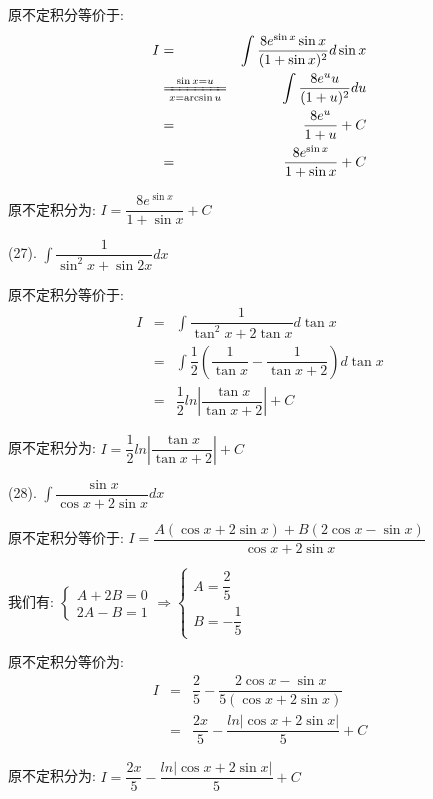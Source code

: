 \begin{anymark}[积分训练]
\begin{solution}
		原不定积分等价于:  
		\begin{eqnarray*}
			I&=&\int \dfrac{8e^{\sin x}\sin x}{(1+\sin x)^2}d\sin x\\
			&\xlongequal[x=\arcsin u]{\sin x=u}&\int\dfrac{8e^{u}u}{(1+u)^2}du\\
			&=&\dfrac{8e^u}{1+u}+C \\
			&=&\dfrac{8e^{\sin x}}{1+\sin x}+C
		\end{eqnarray*}
		
		原不定积分为:  $I=\dfrac{8e^{\sin x}}{1+\sin x}+C$
	\end{solution}
	(27). $\int \dfrac{1}{\sin^2x+\sin 2x}dx$
	\begin{solution}
		
		原不定积分等价于:  
		\begin{eqnarray*}
			I&=&\int \dfrac{1}{\tan^2 x+2\tan x}d\tan x\\
			&=&\int\dfrac{1}{2}\left(\dfrac{1}{\tan x}-\dfrac{1}{\tan x+2}\right)d\tan x\\
			&=&\dfrac{1}{2}ln|\dfrac{\tan x}{\tan x+2}|+C 
		\end{eqnarray*}
	
	原不定积分为:  $I=\dfrac{1}{2}ln|\dfrac{\tan x}{\tan x+2}|+C $
	\end{solution}
	(28). $\int \dfrac{\sin x}{\cos x+2\sin x}dx$
	\begin{solution}
		
		原不定积分等价于:  $I=\dfrac{A(\cos x+2\sin x)+B(2\cos x-\sin x)}{\cos x+2\sin x}$
		
		我们有:  $\left\lbrace
		\begin{array}{l}
			A+2B=0\\
			2A-B=1
		\end{array}
		\right. \Rightarrow \left\lbrace
		\begin{array}{l}
			A=\dfrac{2}{5}\\
			B=-\dfrac{1}{5}
		\end{array}
		\right. $
		
		原不定积分等价为:  
		\begin{eqnarray*}
			I&=&\dfrac{2}{5}-\dfrac{2\cos x-\sin x}{5(\cos x+2\sin x)}\\
			&=&\dfrac{2x}{5}-\dfrac{ln|\cos x+2\sin x|}{5}+C
		\end{eqnarray*}
	
	原不定积分为:  $I=\dfrac{2x}{5}-\dfrac{ln|\cos x+2\sin x|}{5}+C$
	\end{solution}
\end{anymark}

